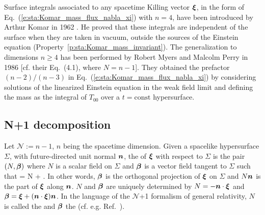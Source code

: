 \begin{hist}
Surface integrals associated to any spacetime Killing vector $\bm{\xi}$,
in the form of Eq.~(\ref{e:sta:Komar_mass_flux_nabla_xi}) with $n=4$,
have been introduced by Arthur Komar in 1962 \cite{Komar62}. He proved
that these integrals are independent of the surface when
they are taken in vacuum, outside the sources of the Einstein equation
(Property~\ref{p:sta:Komar_mass_invariant}). The generalization to
dimensions $n\geq 4$ has been performed by
Robert Myers and Malcolm Perry in 1986 \cite{MyersP86}
[cf. their Eq.~(4.1), where $N=n-1$].
They obtained the prefactor $(n-2)/(n-3)$ in Eq.~(\ref{e:sta:Komar_mass_flux_nabla_xi})
by considering solutions of the linearized Einstein equation in the weak field limit and
defining the mass as the integral of $T_{00}$ over a $t=\mathrm{const}$ hypersurface.
\end{hist}

\subsection{N+1 decomposition} \label{s:sta:np1_decomp}

Let $\mathcal{N} := n - 1$, $n$ being the spacetime dimension.
Given a spacelike hypersurface $\Sigma$, with future-directed unit normal
$\bm{n}$,
the 
of $\bm{\xi}$ with respect to $\Sigma$
is the pair $(N, \bm{\beta})$ where $N$ is a scalar field on $\Sigma$
and $\bm{\beta}$ is a vector field tangent to $\Sigma$ such that
\be \label{e:sta:xi_3p1}
    \w{\xi} = N  + \w{\beta} .
\ee
In other words, $\bm{\beta}$ is the orthogonal projection of $\bm{\xi}$ on $\Sigma$
and $N \bm{n}$ is the part of $\bm{\xi}$ along $\bm{n}$.
$N$ and $\bm{\beta}$ are uniquely determined by
$N = - \bm{n}\cdot\bm{\xi}$ and
$\bm{\beta} = \bm{\xi} + (\bm{n}\cdot\bm{\xi}) \bm{n}$.
In the language of the $\mathcal{N}$+1 formalism of general
relativity, $N$ is called the 
and $\bm{\beta}$ the  (cf. e.g. Ref.~\cite{Gourg12}).

